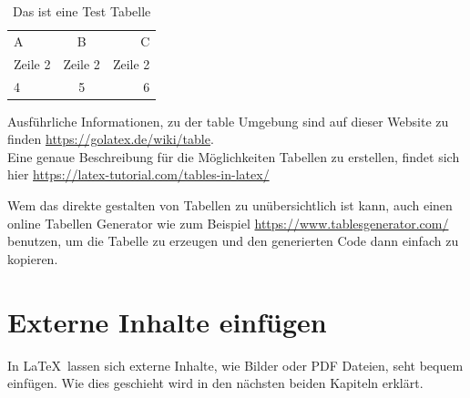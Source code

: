 \documentclass[a4paper, 12pt]{scrreprt}
\begin{document}
\begin{table}[h]
\centering
\begin{tabular}{|l|cr}
A & B & C\\
Zeile 2 & Zeile 2 & Zeile 2\\
\hline
4 & 5 & 6\\
\hline
\end{tabular}
\caption{Das ist eine Test Tabelle}
\end{table}
\noindent Ausführliche Informationen, zu der table Umgebung sind auf dieser Website zu finden \href{https://golatex.de/wiki/table}{https://golatex.de/wiki/table}.\\
Eine genaue Beschreibung für die Möglichkeiten Tabellen zu erstellen, findet sich hier \href{https://latex-tutorial.com/tables-in-latex/}{https://latex-tutorial.com/tables-in-latex/}

Wem das direkte gestalten von Tabellen zu unübersichtlich ist kann, auch einen online Tabellen Generator wie zum Beispiel \href{https://www.tablesgenerator.com/}{https://www.tablesgenerator.com/} benutzen, um die Tabelle zu erzeugen und den generierten Code dann einfach zu kopieren.

\chapter{Externe Inhalte einfügen}
In \LaTeX\, lassen sich externe Inhalte, wie Bilder oder PDF Dateien, seht bequem einfügen. Wie dies geschieht wird in den nächsten beiden Kapiteln erklärt.
\end{document}
